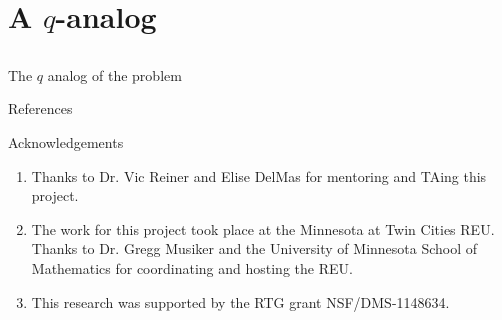 \documentclass{beamer}
\theoremstyle{remark}
\begin{document}

\section{A $q$-analog}
\subsection{}
\begin{frame}{The $q$ analog of the problem}

\end{frame}





\begin{frame}{References}
\nocite{quotients_stanley}
\nocite{algebraic_stanley}


\end{frame}




\begin{frame}{Acknowledgements}
\begin{enumerate}
\item Thanks to Dr. Vic Reiner and Elise DelMas for mentoring and TAing this project.
\item The work for this project took place at the Minnesota at Twin Cities REU.  Thanks to Dr. Gregg Musiker and the University of Minnesota School of Mathematics for coordinating and hosting the REU.
\item This research was supported by the RTG grant NSF/DMS-1148634.
\end{enumerate}
\end{frame}
\end{document}
